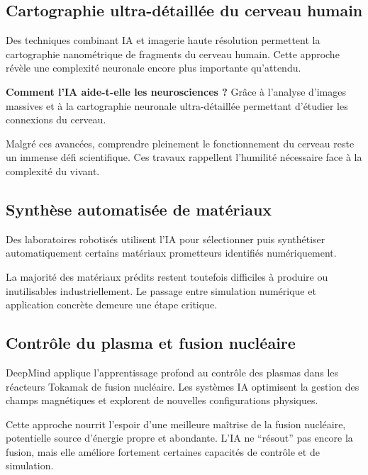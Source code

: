 \documentclass[
  10pt,
  a4paper,
  DIV=11,
  numbers=noendperiod,
  oneside]{scrreprt}
\let\oldtextbf\textbf
\renewcommand{\textbf}[1]{\oldtextbf{\textcolor{cmmnavy}{#1}}}
\begin{document}
\subsection{Cartographie ultra-détaillée du cerveau
humain}\label{cartographie-ultra-duxe9tailluxe9e-du-cerveau-humain}

Des techniques combinant IA et imagerie haute résolution permettent la
cartographie nanométrique de fragments du cerveau humain. Cette approche
révèle une complexité neuronale encore plus importante qu'attendu.

\textbf{Comment l'IA aide-t-elle les neurosciences ?} Grâce à l'analyse
d'images massives et à la cartographie neuronale ultra-détaillée
permettant d'étudier les connexions du cerveau.

Malgré ces avancées, comprendre pleinement le fonctionnement du cerveau
reste un immense défi scientifique. Ces travaux rappellent l'humilité
nécessaire face à la complexité du vivant.

\subsection{Synthèse automatisée de
matériaux}\label{synthuxe8se-automatisuxe9e-de-matuxe9riaux}

Des laboratoires robotisés utilisent l'IA pour sélectionner puis
synthétiser automatiquement certains matériaux prometteurs identifiés
numériquement.

La majorité des matériaux prédits restent toutefois difficiles à
produire ou inutilisables industriellement. Le passage entre simulation
numérique et application concrète demeure une étape critique.

\subsection{Contrôle du plasma et fusion
nucléaire}\label{contruxf4le-du-plasma-et-fusion-nucluxe9aire}

DeepMind applique l'apprentissage profond au contrôle des plasmas dans
les réacteurs Tokamak de fusion nucléaire. Les systèmes IA optimisent la
gestion des champs magnétiques et explorent de nouvelles configurations
physiques.

Cette approche nourrit l'espoir d'une meilleure maîtrise de la fusion
nucléaire, potentielle source d'énergie propre et abondante. L'IA ne
``résout'' pas encore la fusion, mais elle améliore fortement certaines
capacités de contrôle et de simulation.
\end{document}

